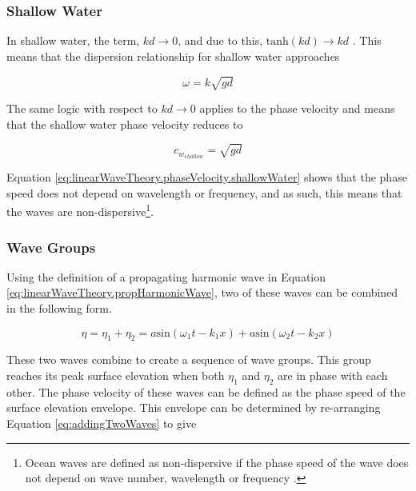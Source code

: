 \subsubsection{Shallow Water} \label{subsec:theory.waves.linearWaveTheory.shallowWater}

In shallow water, the term, $kd \to 0$, and due to this, $\text{tanh}(kd) \to kd$ \cite{Holthuijsen2007}. This means that the dispersion relationship for shallow water approaches

\begin{equation} \label{eq:linearWaveTheory.dispersionRelationship.shallowWater}
    \omega = k\sqrt{gd}
\end{equation}

The same logic with respect to $kd \to 0$ applies to the phase velocity and means that the shallow water phase velocity reduces to 

\begin{equation} \label{eq:linearWaveTheory.phaseVelocity.shallowWater}
    c_{w_{shallow}} = \sqrt{gd}
\end{equation}

Equation \ref{eq:linearWaveTheory.phaseVelocity.shallowWater} shows that the phase speed does not depend on wavelength or frequency, and as such, this means that the waves are non-dispersive\footnote{Ocean waves are defined as non-dispersive if the phase speed of the wave does not depend on wave number, wavelength or frequency \cite{Holthuijsen2007}.}.

\subsubsection{Wave Groups} \label{subsec:theory.waves.linearWaveTheory.twoHarmonicWaves}

Using the definition of a propagating harmonic wave in Equation \ref{eq:linearWaveTheory.propHarmonicWave}, two of these waves can be combined in the following form.

\begin{equation} \label{eq:addingTwoWaves}
    \eta = \eta_{1} + \eta_{2} = a\text{sin}(\omega_{1}t - k_{1}x) + a\text{sin}(\omega_{2}t - k_{2}x)
\end{equation}

These two waves combine to create a sequence of wave groups. This group reaches its peak surface elevation when both $\eta_{1}$ and $\eta_{2}$ are in phase with each other. The phase velocity of these waves can be defined as the phase speed of the surface elevation envelope. This envelope can be determined by re-arranging Equation \ref{eq:addingTwoWaves} to give

